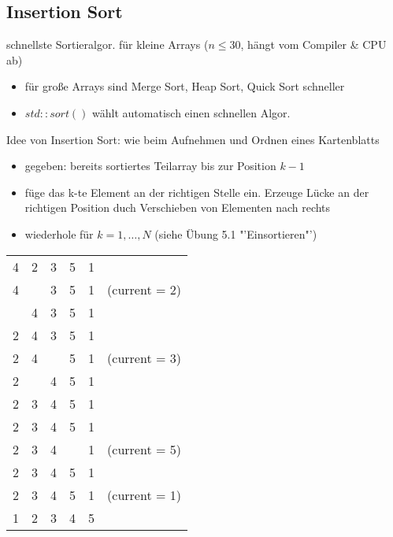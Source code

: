 \documentclass{article}
\begin{document}
	\subsection{Insertion Sort}
	schnellste Sortieralgor. für kleine Arrays ($n\leq 30$, hängt vom Compiler \& CPU ab)
	\begin{itemize}
		\item für große Arrays sind Merge Sort, Heap Sort, Quick Sort schneller
		\item $std::sort()$ wählt automatisch einen schnellen Algor.
	\end{itemize}
	
	Idee von Insertion Sort: wie beim Aufnehmen und Ordnen eines Kartenblatts
	\begin{itemize}
		\item gegeben: bereits sortiertes Teilarray bis zur Position $k-1$
		\item füge das k-te Element an der richtigen Stelle ein. Erzeuge Lücke an der richtigen Position duch Verschieben von Elementen nach rechts
		\item wiederhole für $k = 1,\dots , N$  (siehe Übung 5.1 "'Einsortieren"')
	\end{itemize}
	\begin{tabular} {cccccc}
		4 & 2 & 3 & 5 & 1 & \\  
		4 & & 3 & 5 & 1 & (current = 2) \\
		 & 4 & 3 & 5 & 1 & \\
		 2 & 4 & 3 & 5 & 1 & \\
		 2 & 4 & & 5 & 1 & (current = 3) \\ 
		 2 & & 4 & 5 & 1 & \\
		 2 & 3 & 4 & 5 & 1 & \\ 
		 2 & 3 & 4 & 5 & 1 & \\	 
		 2 & 3 & 4 &  & 1 & (current = 5)	\\		 
		 2 & 3 & 4 & 5 & 1 & \\		
		 2 & 3 & 4 & 5 & 1 & (current = 1)	\\   
		 1 & 2 & 3 & 4 & 5 & \\
	\end{tabular}
	
\end{document}

